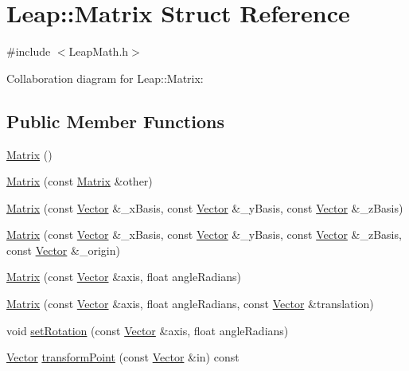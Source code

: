 \hypertarget{struct_leap_1_1_matrix}{}\section{Leap\+:\+:Matrix Struct Reference}
\label{struct_leap_1_1_matrix}


{\ttfamily \#include $<$Leap\+Math.\+h$>$}



Collaboration diagram for Leap\+:\+:Matrix\+:
\subsection*{Public Member Functions}
\begin{DoxyCompactItemize}
\item 
\hyperlink{struct_leap_1_1_matrix_a4d6481d902815a4cb8d3982fed44499c}{Matrix} ()
\item 
\hyperlink{struct_leap_1_1_matrix_a21ac99c16f55dbbb9295254fd4deb0ea}{Matrix} (const \hyperlink{struct_leap_1_1_matrix}{Matrix} \&other)
\item 
\hyperlink{struct_leap_1_1_matrix_a64f54ffc81b0ab492edb8a4c19dc6675}{Matrix} (const \hyperlink{struct_leap_1_1_vector}{Vector} \&\+\_\+x\+Basis, const \hyperlink{struct_leap_1_1_vector}{Vector} \&\+\_\+y\+Basis, const \hyperlink{struct_leap_1_1_vector}{Vector} \&\+\_\+z\+Basis)
\item 
\hyperlink{struct_leap_1_1_matrix_a54c6172ddcd4f52de044faedad060e04}{Matrix} (const \hyperlink{struct_leap_1_1_vector}{Vector} \&\+\_\+x\+Basis, const \hyperlink{struct_leap_1_1_vector}{Vector} \&\+\_\+y\+Basis, const \hyperlink{struct_leap_1_1_vector}{Vector} \&\+\_\+z\+Basis, const \hyperlink{struct_leap_1_1_vector}{Vector} \&\+\_\+origin)
\item 
\hyperlink{struct_leap_1_1_matrix_afbd0364e85e050f935432b27cfb7c8cc}{Matrix} (const \hyperlink{struct_leap_1_1_vector}{Vector} \&axis, float angle\+Radians)
\item 
\hyperlink{struct_leap_1_1_matrix_ac0004234bfba1a275a062725b8c56572}{Matrix} (const \hyperlink{struct_leap_1_1_vector}{Vector} \&axis, float angle\+Radians, const \hyperlink{struct_leap_1_1_vector}{Vector} \&translation)
\item 
void \hyperlink{struct_leap_1_1_matrix_ac48ea6588487ef4be20a31a663f58be6}{set\+Rotation} (const \hyperlink{struct_leap_1_1_vector}{Vector} \&axis, float angle\+Radians)
\item 
\hyperlink{struct_leap_1_1_vector}{Vector} \hyperlink{struct_leap_1_1_matrix_ac583a10a7bdbf7ed03fd53b8604a41fc}{transform\+Point} (const \hyperlink{struct_leap_1_1_vector}{Vector} \&in) const

\end{DoxyCompactItemize}
